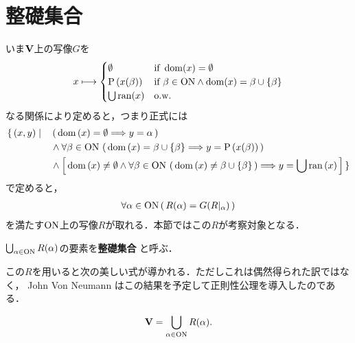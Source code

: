 \section{整礎集合}
	いま$\mathbf{V}$上の写像$G$を
	\begin{align}
		x \longmapsto
		\begin{cases}
			\emptyset & \mbox{if } \operatorname{dom}(x) = \emptyset \\
			\operatorname*{P} \left(x(\beta)\right) & \mbox{if } \beta \in \mathrm{ON} \wedge \operatorname{dom}(x) = \beta \cup \{\beta\} \\
			\bigcup \operatorname{ran}(x) & \mathrm{o.w.}
		\end{cases}
	\end{align}
	なる関係により定めると，つまり正式には
	\begin{align}
		\{\, (x,y) \mid \quad &\left(\, \operatorname*{dom} \left(x\right) = \emptyset \Longrightarrow y = \alpha\, \right) \\
		&\wedge \forall \beta \in \mathrm{ON}\, \left(\, \operatorname*{dom} \left(x\right) = \beta \cup \{\beta\} \Longrightarrow y = \operatorname*{P} \left(x(\beta)\right)\, \right) \\
		&\wedge \left[\, \operatorname*{dom} \left(x\right) \neq \emptyset \wedge \forall \beta \in \mathrm{ON}\, \left(\, \operatorname*{dom} \left(x\right) \neq \beta \cup \{\beta\}\, \right)
		\Longrightarrow y = \bigcup \operatorname*{ran} \left(x\right)\, \right]\, \}
	\end{align}
	で定めると，
	\begin{align}
		\forall \alpha \in \mathrm{ON}\, (\, R(\alpha) = G(R|_\alpha)\, )
	\end{align}
	を満たす$\mathrm{ON}$上の写像$R$が取れる．本節ではこの$R$が考察対象となる．
	
	\begin{screen}
		\begin{dfn}[整礎集合]
			$\bigcup_{\alpha \in \mathrm{ON}} R(\alpha)$の要素を{\bf 整礎集合}
			と呼ぶ．
		\end{dfn}
	\end{screen}
	
	この$R$を用いると次の美しい式が導かれる．ただしこれは偶然得られた訳ではなく，
	John Von Neumann はこの結果を予定して正則性公理を導入したのである．
	
	\begin{screen}
		\begin{thm}[すべての集合は整礎的である]\label{thm:every_set_is_well_founded}
			\begin{align}
				\mathbf{V} = \bigcup_{\alpha \in \mathrm{ON}} R(\alpha).
			\end{align}
		\end{thm}
	\end{screen}
	
